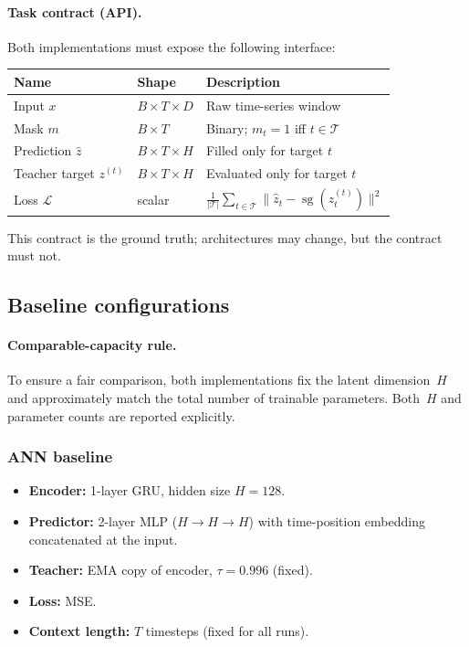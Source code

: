 \documentclass[11pt,a4paper]{article}
\newcommand{\sg}{\operatorname{sg}}        %
\begin{document}
\paragraph{Task contract (API).}
Both implementations must expose the following interface:

\begin{center}
\begin{tabular}{@{}lll@{}}
\toprule
\textbf{Name} & \textbf{Shape} & \textbf{Description} \\
\midrule
Input $x$
  & $B \times T \times D$
  & Raw time-series window \\
Mask $m$
  & $B \times T$
  & Binary; $m_t=1$ iff $t\in\mathcal{T}$ \\
Prediction $\hat{z}$
  & $B \times T \times H$
  & Filled only for target $t$ \\
Teacher target $z^{(t)}$
  & $B \times T \times H$
  & Evaluated only for target $t$ \\
Loss $\mathcal{L}$
  & scalar
  & $\frac{1}{|\mathcal{T}|}\sum_{t\in\mathcal{T}}
     \lVert \hat{z}_t - \sg(z_t^{(t)}) \rVert^2$ \\
\bottomrule
\end{tabular}
\end{center}

This contract is the ground truth; architectures may change, but the
contract must not.

\subsection{Baseline configurations}\label{sec:baselines}

\paragraph{Comparable-capacity rule.}
To ensure a fair comparison, both implementations fix the latent
dimension~$H$ and approximately match the total number of trainable
parameters.  Both~$H$ and parameter counts are reported explicitly.

\subsubsection{ANN baseline}

\begin{itemize}[nosep]
\item \textbf{Encoder:} 1-layer GRU, hidden size $H=128$.
\item \textbf{Predictor:} 2-layer MLP ($H\!\to\!H\!\to\!H$) with
  time-position embedding concatenated at the input.
\item \textbf{Teacher:} EMA copy of encoder, $\tau=0.996$ (fixed).
\item \textbf{Loss:} MSE.
\item \textbf{Context length:} $T$ timesteps (fixed for all runs).
\end{itemize}
\end{document}
